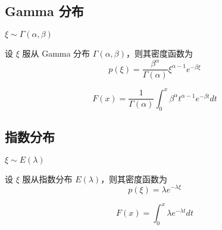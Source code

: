 \documentclass[12pt,a4paper]{amsart}
\begin{document}
\subsection{Gamma 分布}

$\xi\sim \Gamma(\alpha, \beta)$

\begin{definition}[Gamma 分布]
    设 $\xi$ 服从 Gamma 分布 $\Gamma(\alpha, \beta)$，则其密度函数为
    \begin{equation}
        p(\xi) = \frac{\beta^\alpha}{\Gamma(\alpha)}\xi^{\alpha-1}e^{-\beta\xi}
    \end{equation}
\end{definition}

\begin{proposition}
    \begin{equation}
        F(x) = \frac{1}{\Gamma(\alpha)}\int_{0}^{x}\beta^\alpha t^{\alpha-1}e^{-\beta t}dt
    \end{equation}
\end{proposition}

\subsection{指数分布}

$\xi\sim E(\lambda)$

\begin{definition}[指数分布]
    设 $\xi$ 服从指数分布 $E(\lambda)$，则其密度函数为
    \begin{equation}
        p(\xi) = \lambda e^{-\lambda\xi}
    \end{equation}
\end{definition}

\begin{proposition}[指数分布的分布函数]
    \begin{equation}
        F(x) = \int_{0}^{x}\lambda e^{-\lambda t}dt
    \end{equation}
\end{proposition}

\appendix



{\footnotesize}
\end{document}
